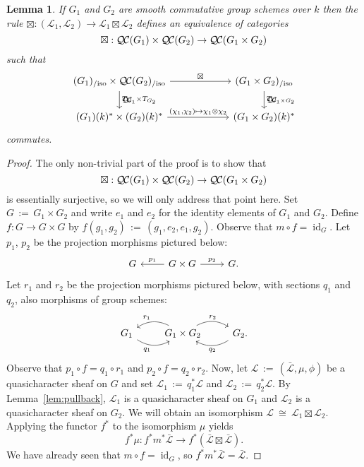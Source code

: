 \documentclass[CM,Submssn,SecEq]{degruyter-crelle} %
\theoremstyle{plain}
\newtheorem{lemma}[theorem]{Lemma}
\theoremstyle{definition}
\theoremstyle{remark}
\newcommand{\Fq}{k}
\DeclareMathOperator{\id}{id}
\newcommand{\ceq}{{\, :=\, }}
\newcommand{\iso}{{\ \cong\ }}
\newcommand{\TrFrob}[1]{T_{#1}}
\newcommand{\qcs}[1]{{\mathcal{#1}}}
\newcommand{\gqcs}[1]{{\mathcal{\bar #1}}}
\newcommand{\QC}{{\mathcal{Q\hskip-0.8pt C}}}
\newcommand{\QCiso}[1]{\QC(#1)_{/\text{iso}}}
\begin{document}
\begin{lemma}\label{lem:product}
If $G_1$ and $G_2$ are smooth commutative group schemes over $\Fq$ then the rule
$\boxtimes : (\qcs{L}_1,\qcs{L}_2)\to \qcs{L}_1\boxtimes\qcs{L}_2$ defines an equivalence of categories
\[
\boxtimes : \QC(G_1)\times \QC(G_2) \to \QC(G_1\times G_2)
\]
such that
\[
\begin{tikzcd}[column sep=60]
\arrow{d}{\TrFrob{G_1} \times \TrFrob{G_2}} \QCiso{G_1}\times \QCiso{G_2} \arrow{r}{\boxtimes}
& \arrow{d}{\TrFrob{G_1\times G_2}} \QCiso{G_1\times G_2}\\
(G_1)(\Fq)^*\times (G_2)(\Fq)^* \arrow{r}{(\chi_1,\chi_2)\mapsto \chi_1\otimes \chi_2}  & (G_1\times G_2)(\Fq)^*
\end{tikzcd}
\]
commutes.
\end{lemma}
\begin{proof}
The only non-trivial part of the proof is to show that 
\[\boxtimes
 : \QC(G_1)\times \QC(G_2) \to \QC(G_1\times G_2)
 \]
is essentially surjective, so we will only address that point here.
%
Set $G \ceq G_1\times G_2$
and write $e_1$ and $e_2$ for the identity elements of $G_1$ and $G_2$.
Define $f : G\to G\times G$ by $f(g_1,g_2) \ceq (g_1,e_2,e_1,g_2)$.
Observe that $m\circ f = \id_G$.
Let $p_1$, $p_2$ be the projection morphisms pictured below:
\[
\begin{tikzcd}
G & \arrow[swap]{l}{p_1} G\times G \arrow{r}{p_2} & G.
\end{tikzcd}
\]
Let $r_1$ and $r_2$ be the projection morphisms pictured below,
with sections $q_1$ and $q_2$, also morphisms of group schemes:
\[
\begin{tikzcd}
G_1  \arrow[swap, bend right]{r}{q_1} &
\arrow[swap, bend right]{l}{r_1} G_1\times G_2 \arrow[bend left]{r}{r_2} &
\arrow[bend left]{l}{q_2} G_2.
\end{tikzcd}
\]
Observe that $p_1\circ f = q_1 \circ r_1$ and $p_2 \circ f = q_2\circ r_2$.
%
Now, let $\qcs{L} \ceq (\gqcs{L},\mu,\phi)$ be a quasicharacter sheaf on $G$
and set $\qcs{L}_1 \ceq q_1^* \qcs{L}$ and $\qcs{L}_2 \ceq q_2^* \qcs{L}$.
By Lemma~\ref{lem:pullback}, $\qcs{L}_1$ is a quasicharacter sheaf on $G_1$
and $\qcs{L}_2$ is a quasicharacter sheaf on $G_2$.
We will obtain an isomorphism $\qcs{L} \iso  \qcs{L}_1\boxtimes \qcs{L}_2$.
Applying the functor $f^*$ to the isomorphism $\mu$ yields
\begin{equation}\label{eq:fm}
f^*\mu : f^* m^* \gqcs{L} \to f^*(\gqcs{L}\boxtimes \gqcs{L}) .
\end{equation}
We have already seen that $m\circ f = \id_G$, so $f^* m^* \gqcs{L} = \gqcs{L}$.  

\end{proof}
\end{document}
